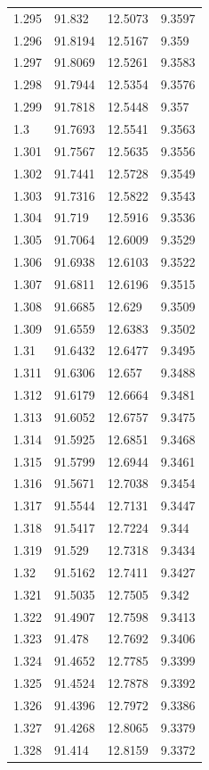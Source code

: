 \begin{tabular}{llll}
1.295 & 91.832 & 12.5073 & 9.3597 \\
1.296 & 91.8194 & 12.5167 & 9.359 \\
1.297 & 91.8069 & 12.5261 & 9.3583 \\
1.298 & 91.7944 & 12.5354 & 9.3576 \\
1.299 & 91.7818 & 12.5448 & 9.357 \\
1.3 & 91.7693 & 12.5541 & 9.3563 \\
1.301 & 91.7567 & 12.5635 & 9.3556 \\
1.302 & 91.7441 & 12.5728 & 9.3549 \\
1.303 & 91.7316 & 12.5822 & 9.3543 \\
1.304 & 91.719 & 12.5916 & 9.3536 \\
1.305 & 91.7064 & 12.6009 & 9.3529 \\
1.306 & 91.6938 & 12.6103 & 9.3522 \\
1.307 & 91.6811 & 12.6196 & 9.3515 \\
1.308 & 91.6685 & 12.629 & 9.3509 \\
1.309 & 91.6559 & 12.6383 & 9.3502 \\
1.31 & 91.6432 & 12.6477 & 9.3495 \\
1.311 & 91.6306 & 12.657 & 9.3488 \\
1.312 & 91.6179 & 12.6664 & 9.3481 \\
1.313 & 91.6052 & 12.6757 & 9.3475 \\
1.314 & 91.5925 & 12.6851 & 9.3468 \\
1.315 & 91.5799 & 12.6944 & 9.3461 \\
1.316 & 91.5671 & 12.7038 & 9.3454 \\
1.317 & 91.5544 & 12.7131 & 9.3447 \\
1.318 & 91.5417 & 12.7224 & 9.344 \\
1.319 & 91.529 & 12.7318 & 9.3434 \\
1.32 & 91.5162 & 12.7411 & 9.3427 \\
1.321 & 91.5035 & 12.7505 & 9.342 \\
1.322 & 91.4907 & 12.7598 & 9.3413 \\
1.323 & 91.478 & 12.7692 & 9.3406 \\
1.324 & 91.4652 & 12.7785 & 9.3399 \\
1.325 & 91.4524 & 12.7878 & 9.3392 \\
1.326 & 91.4396 & 12.7972 & 9.3386 \\
1.327 & 91.4268 & 12.8065 & 9.3379 \\
1.328 & 91.414 & 12.8159 & 9.3372 \\

\end{tabular}
